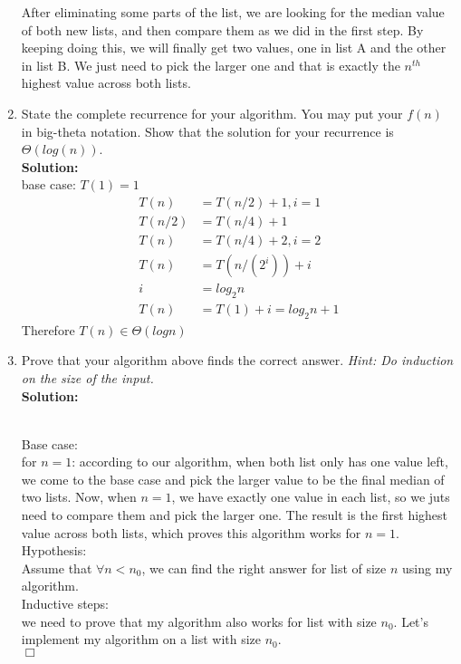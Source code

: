 \documentclass[10pt]{article}
\newenvironment{proof}{\par\noindent{\it Proof.}\hspace*{1em}}{$\Box$\bigskip}
\begin{document}
\begin{enumerate}
    After eliminating some parts of the list, we are looking for the median value of both new lists, and then compare them as we did in the first step. By keeping doing this, we will finally get two values, one in list A and the other in list B. We just need to pick the larger one and that is exactly the $n^{th}$ highest value across both lists.
    \item State the complete recurrence for your algorithm. You may put your $f(n)$ in big-theta notation. Show that the solution for your recurrence is $\Theta(log(n))$.\\
    \textbf{Solution:}  \\
    base case: $T(1) = 1$
    \begin{align*}
    T(n) &= T(n/2)+1 , i = 1\\
    T(n/2) &= T(n/4) + 1\\
    T(n) &= T(n/4) + 2, i = 2\\
    T(n) &= T(n/(2^i))+i\\
    i &= log_2 n\\
    T(n) &= T(1) + i = log_2 n + 1
    \end{align*}
    Therefore $T(n) \in \Theta(log n)$
    \item Prove that your algorithm above finds the correct answer. \emph{Hint: Do induction on the size of the input.}\\
    \textbf{Solution:}  
    \begin{proof} \\
    	Base case: \\
    	for $n = 1$: according to our algorithm, when both list only has one value left, we come to the base case and pick the larger value to be the final median of two lists. Now, when $n = 1$, we have exactly one value in each list, so we juts need to compare them and pick the larger one. The result is the first highest value across both lists, which proves this algorithm works for $n = 1$.\\
    	
    	Hypothesis: \\
    	Assume that $\forall n < n_0$, we can find the right answer for list of size $n$ using my algorithm.\\
    	
    	Inductive steps: \\
    	we need to prove that my algorithm also works for list with size $n_0$. Let's implement my algorithm on a list with size $n_0$. \\
    	

\end{proof}
\end{enumerate}
\end{document}
